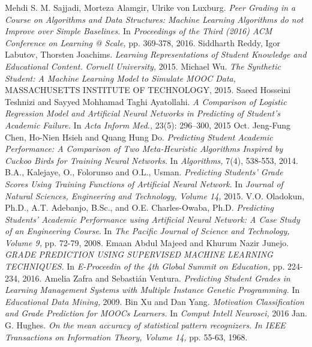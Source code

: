 \clearpage
{}

\begin{thebibliography}{99}
		{Mehdi S. M. Sajjadi, Morteza Alamgir, Ulrike von Luxburg. \emph{Peer Grading in a Course on Algorithms and Data Structures: Machine Learning Algorithms do not Improve over Simple Baselines.} In \emph{Proceedings of the Third (2016) ACM Conference on Learning @ Scale,} pp. 369-378, 2016.}
		{Siddharth Reddy, Igor Labutov, Thorsten Joachims. \emph{Learning Representations of Student Knowledge and Educational Content.} \emph{Cornell University,} 2015.}
		{Michael Wu. \emph{The Synthetic Student: A Machine Learning Model to Simulate MOOC Data,} MASSACHUSETTS INSTITUTE OF TECHNOLOGY, 2015.}
		{Saeed Hosseini Teshnizi and Sayyed Mohhamad Taghi Ayatollahi. \emph{A Comparison of Logistic Regression Model and Artificial Neural Networks in Predicting of Student’s Academic Failure.} In \emph{Acta Inform Med., } 23(5): 296–300, 2015 Oct.}
		{Jeng-Fung Chen, Ho-Nien Hsieh and Quang Hung Do. \emph{Predicting Student Academic Performance: A Comparison of Two Meta-Heuristic Algorithms Inspired by Cuckoo Birds for Training Neural Networks}. In \emph{Algorithms,} 7(4), 538-553, 2014.}
		{B.A., Kalejaye, O., Folorunso and O.L., Usman. \emph{Predicting Students' Grade Scores Using Training Functions of Artificial Neural Network}. In \emph{Journal of Natural Sciences, Engineering and Technology, Volume 14,} 2015.}
		{V.O. Oladokun, Ph.D., A.T. Adebanjo, B.Sc., and O.E. Charles-Owaba, Ph.D. \emph{Predicting Students’ Academic Performance using Artificial Neural Network: A Case Study of an Engineering Course}. In \emph{The Pacific Journal of Science and Technology, Volume 9,} pp. 72-79, 2008.}
		{Emaan Abdul Majeed and Khurum Nazir Junejo. \emph{GRADE PREDICTION USING SUPERVISED MACHINE LEARNING TECHNIQUES.} In \emph{E-Proceedin of the 4th Global Summit on Education,} pp. 224-234, 2016.}
		{Amelia Zafra and Sebastián Ventura. \emph{Predicting Student Grades in Learning Management 
		Systems with Multiple Instance Genetic Programming.} In \emph{Educational Data Mining,} 2009.}
		{Bin Xu and Dan Yang. \emph{Motivation Classification and Grade Prediction for MOOCs Learners.} In \emph{Comput Intell Neurosci,} 2016 Jan.}
		{G. Hughes. \emph{On the mean accuracy of statistical pattern recognizers}. \emph{In IEEE Transactions on Information Theory, Volume 14,} pp. 55-63, 1968.}
\end{thebibliography}

